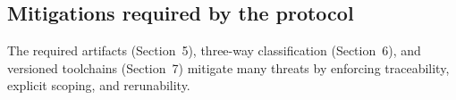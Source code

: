\subsection*{Mitigations required by the protocol}
The required artifacts (Section~5), three-way classification (Section~6), and versioned toolchains (Section~7) mitigate many threats by enforcing traceability, explicit scoping, and rerunability.